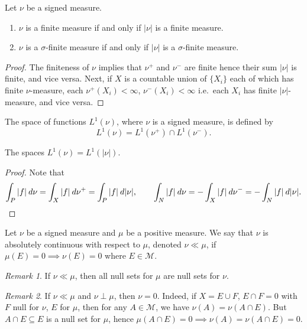 \documentclass[11pt]{article}
\newcommand{\M}{\mathcal{M}}
\theoremstyle{definition}
\theoremstyle{remark}
\newtheorem*{remark}{Remark}
\begin{document}
    \begin{lemma}
        Let $\nu$ be a signed measure.
        \begin{enumerate}
            \item $\nu$ is a finite measure if and only if $|\nu|$ is a finite measure.
            \item $\nu$ is a $\sigma$-finite measure if and only if $|\nu|$ is a
            $\sigma$-finite measure.
        \end{enumerate}
    \end{lemma}
    \begin{proof}
        The finiteness of $\nu$ implies that $\nu^+$ and $\nu^-$ are finite hence
        their sum $|\nu|$ is finite, and vice versa. Next, if $X$ is a countable
        union of $\{X_i\}$ each of which has finite $\nu$-measure, each $\nu^+(X_i) <
        \infty$, $\nu^-(X_i) < \infty$ i.e.\ each $X_i$ has finite $|\nu|$-measure,
        and vice versa.
    \end{proof}

    \begin{definition}
        The space of functions $L^1(\nu)$, where $\nu$ is a signed measure, is
        defined by \[
            L^1(\nu) = L^1(\nu^+) \cap L^1(\nu^-).
        \]
    \end{definition}

    \begin{lemma}
        The spaces $L^1(\nu) = L^1(|\nu|)$.
    \end{lemma}
    \begin{proof}
        Note that \[
            \int_P |f|\:d\nu = \int_X |f|\:d\nu^+ = \int_P |f|\:d|\nu|, \qquad
            \int_N |f|\:d\nu = -\int_X |f|\:d\nu^- = -\int_N |f|\:d|\nu|. \qedhere
        \]
    \end{proof}

    \begin{definition}
        Let $\nu$ be a signed measure and $\mu$ be a positive measure. We say that
        $\nu$ is absolutely continuous with respect to $\mu$, denoted $\nu\ll\mu$, if
        $\mu(E) = 0 \implies \nu(E) = 0$ where $E \in \M$.
        \begin{remark}
            If $\nu \ll \mu$, then all null sets for $\mu$ are null sets for $\nu$.
        \end{remark}
        \begin{remark}
            If $\nu \ll \mu$ and $\nu \perp \mu$, then $\nu = 0$. Indeed, if $X = E
            \cup F$, $E \cap F = 0$ with $F$ null for $\nu$, $E$ \null for $\mu$,
            then for any $A \in \M$, we have $\nu(A) = \nu(A \cap E)$. But $A \cap E
            \subseteq E$ is a null set for $\mu$, hence $\mu(A \cap E) = 0 \implies
            \nu(A) = \nu(A \cap E) = 0$.
        \end{remark}
    \end{definition}
\end{document}
